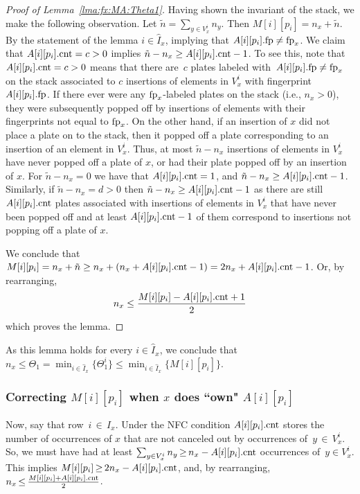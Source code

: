 \begin{proof}[Proof of Lemma~\ref{lma:fx:MA:Theta1}]
    Having shown the invariant of the stack, we make the following observation.  
    Let $\tilde{n} =  \sum_{y\in V_x^i} n_y$. Then $M[i][p_i] = n_x + \tilde{n}$. By the statement of the lemma $i \in \hat{I}_x$, implying that $A[i][p_i].\textup{fp} \neq \textup{fp}_x$.  
    We claim that $A[i][p_i].\textup{cnt}=c>0$ implies $\tilde{n}-n_x \geq A[i][p_i].\textup{cnt}-1$. To see this, note that $A[i][p_i].\textup{cnt}=c>0$ means that there are~$c$ plates labeled with~$A[i][p_i].\textup{fp} \neq \textup{fp}_x$ on the stack associated to $c$ insertions of elements in $V_x^i$ with fingerprint $A[i][p_i].\textup{fp}$. If there ever were any $\textup{fp}_x$-labeled plates on the stack (i.e., $n_x >0$), they were subsequently popped off by insertions of elements with their fingerprints not equal to $\textup{fp}_x$.  
    On the other hand, if an insertion of $x$ did not place a plate on to the stack, then it popped off a plate corresponding to an insertion of an element in $V_x^i$. Thus, at most $\tilde{n}-n_x$ insertions of elements in  
    $V_x^i$ have never popped off a plate of $x$, or had their plate popped off by an insertion of $x$.
    For $\tilde{n}-n_x = 0$ we have that $A[i][p_i].\textup{cnt}=1$,
    and $\tilde{n}-n_x \geq A[i][p_i].\textup{cnt} - 1$.  Similarly, if $\tilde{n}-n_x = d > 0$ then
    $\tilde{n}-n_x \geq A[i][p_i].\textup{cnt} - 1$ as there are still $A[i][p_i].\textup{cnt}$ plates associated with insertions of elements in $V_x^i$ that
    have never been popped off and at least $A[i][p_i].\textup{cnt}-1$ of them correspond to insertions not popping off a plate of $x$. 
    
    We conclude that 
    $
    M[i][p_i] = n_x + \tilde{n} \geq n_x + (n_x + A[i][p_i].\textup{cnt} -1) = 2n_x +  A[i][p_i].\textup{cnt} -1
    $.  Or, by rearranging,
    \[
    n_x \leq \frac{M[i][p_i] - A[i][p_i].\textup{cnt} + 1}{2}
    \] 
    which proves the lemma.
\end{proof}

\noindent
As this lemma holds for every $i \in \hat{I}_x$, we conclude that $n_x \leq \Theta_1=\min_{i \in \hat{I}_x}\{\Theta^i_1\} \leq \min_{i \in \hat{I}_x}\{M[i][p_i]\}$.  

\subsubsection{Correcting $M[i][p_i]$ when $x$ does ``own" $A[i][p_i]$}
Now, say that row~$i \,{\in}\, I_x$. Under the NFC condition
$A[i][p_i].\textup{cnt}$ stores the number of occurrences of $x$ that are not canceled out by occurrences of~$y \,{\in}\, V^i_x$. So,  
we must have had at least $\sum_{y \in V^i_x}n_y \,{\geq}\, n_x - A[i][p_i].\textup{cnt}$ occurrences of~$y \in V^i_x$. This implies $M[i][p_i] 
\,{\geq}\, 2n_x  - A[i][p_i].\textup{cnt}$, and, by rearranging, $n_x \,{\leq}\,  \frac{M[i][p_i] + A[i][p_i].\textup{cnt}}{2}$.

